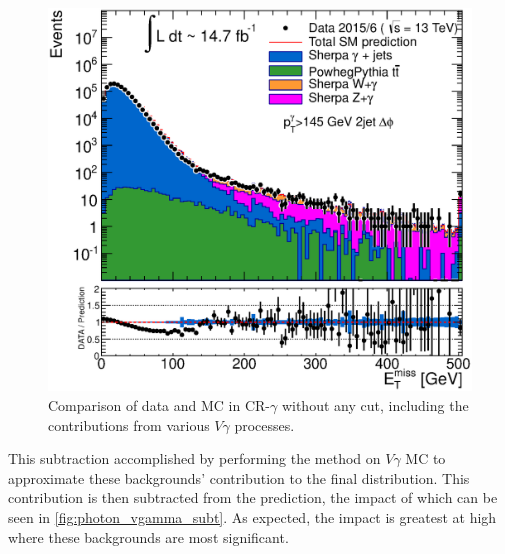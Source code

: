 \begin{centering}
\begin{figure}[!hbt]
\myfloatalign
\includegraphics[width=.90\linewidth]{figures/photons/hPhot_Met_dPhiJet_hist.eps}
\caption{Comparison of data and \ac{MC} in CR-$\gamma$ without any \HT cut, including the contributions from various $V\gamma$ processes.}
\label{fig:photon_vgamma}
\end{figure}
\end{centering}

This subtraction accomplished by performing the \gjets method on $V\gamma$ \ac{MC} to approximate these backgrounds' contribution to the final \met distribution. This contribution is then subtracted from the \gjets prediction, the impact of which can be seen in \autoref{fig:photon_vgamma_subt}. As expected, the impact is greatest at high \met where these backgrounds are most significant.

